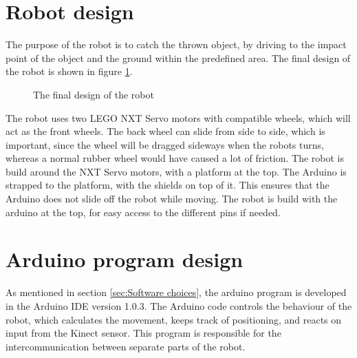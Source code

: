 \section{Robot design}
\label{sec:Robot design}
The purpose of the robot is to catch the thrown object, by driving to the impact point of the object and the ground within the predefined area. The final design of the robot is shown in figure \ref{robot}.


\begin{figure}[h]
	\centering
	\caption{The final design of the robot}
	\label{robot}
\end{figure}


The robot uses two LEGO NXT Servo motors with compatible wheels, which will act as the front wheels. The back wheel can slide from side to side, which is important, since the wheel will be dragged sideways when the robots turns, whereas a normal rubber wheel would have caused a lot of friction. 
The robot is build around the NXT Servo motors, with a platform at the top. The Arduino is strapped to the platform, with the shields on top of it. This ensures that the Arduino does not slide off the robot while moving.
The robot is build with the arduino at the top, for easy access to the different pins if needed. 


\section{Arduino program design}
\label{sec:Arduino program design}
As mentioned in section \ref{sec:Software choices}, the arduino program is developed in the Arduino IDE version 1.0.3. The Arduino code controls the behaviour of the robot, which calculates the movement, keeps track of positioning, and reacts on input from the Kinect sensor. This program is responsible for the intercommunication between separate parts of the robot.


